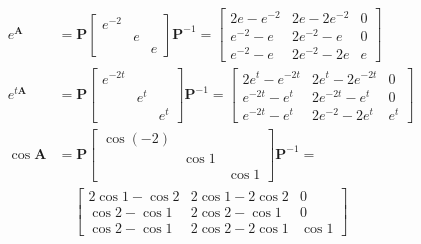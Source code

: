 \begin{align*}
    e^{\bm{A}}  & = \bm{P}\begin{bmatrix}
                              e^{-2} &   &   \\
                                     & e &   \\
                                     &   & e
                          \end{bmatrix} \bm{P}^{-1} =
    \begin{bmatrix}
        2e - e^{-2} & 2e -2e^{-2}  & 0 \\
        e^{-2} -e   & 2e^{-2} - e  & 0 \\
        e^{-2} - e  & 2e^{-2} - 2e & e
    \end{bmatrix}                    \\
    e^{t\bm{A}} & = \bm{P}\begin{bmatrix}
                              e^{-2t} &     &     \\
                                      & e^t &     \\
                                      &     & e^t
                          \end{bmatrix} \bm{P}^{-1} =
    \begin{bmatrix}
        2e^t - e^{-2t} & 2e^t -2e^{-2t} & 0   \\
        e^{-2t} -e^t   & 2e^{-2t} - e^t & 0   \\
        e^{-2t} - e^t  & 2e^{-2} - 2e^t & e^t
    \end{bmatrix}             \\
    \cos\bm{A}  & = \bm{P}\begin{bmatrix}
                              \cos(-2) &       &       \\
                                       & \cos1 &       \\
                                       &       & \cos1
                          \end{bmatrix} \bm{P}^{-1} =
\end{align*}
\begin{gather*}
    \begin{bmatrix}
        2\cos1 - \cos2 & 2\cos1 - 2\cos2 & 0     \\
        \cos2 - \cos1  & 2\cos2 - \cos1  & 0     \\
        \cos2 - \cos1  & 2\cos2 - 2\cos1 & \cos1
    \end{bmatrix}
\end{gather*}

